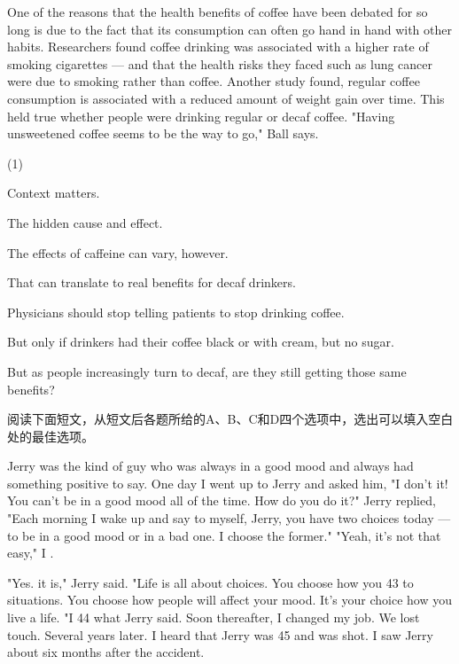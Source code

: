 \documentclass{英语试卷}
\begin{document}
\par One of the reasons that the health benefits of coffee have been debated for so long is due to the fact that its consumption can often go hand in hand with other habits. Researchers found coffee drinking was associated with a higher rate of smoking cigarettes — and that the health risks they faced such as lung cancer were due to smoking rather than coffee. Another study found, regular coffee consumption is associated with a reduced amount of weight gain over time.  This held true whether people were drinking regular or decaf coffee. "Having unsweetened coffee seems to be the way to go," Ball says.\par
\begin{choices}(1)
  \item Context matters.
  \item The hidden cause and effect.
  \item The effects of caffeine can vary, however.
  \item That can translate to real benefits for decaf drinkers.
  \item Physicians should stop telling patients to stop drinking coffee.
  \item But only if drinkers had their coffee black or with cream, but no sugar.
  \item But as people increasingly turn to decaf, are they still getting those same benefits?
\end{choices}
\par 阅读下面短文，从短文后各题所给的A、B、C和D四个选项中，选出可以填入空白处的最佳选项。\par
\par Jerry was the kind of guy who was always in a good mood and always had something positive to say. One day I went up to Jerry and asked him, "I don't  it! You can't be in a good mood all of the time. How do you do it?" Jerry replied, "Each morning I wake up and say to myself, Jerry, you have two choices today — to be in a good mood or in a bad one. I choose the former." "Yeah, it's not that easy," I .\par
\par "Yes. it is," Jerry said. "Life is all about choices. You choose how you \blanknum{} 43\blanknum{} to situations. You choose how people will affect your mood. It's your choice how you live a life. "I \blanknum{} 44\blanknum{} what Jerry said. Soon thereafter, I changed my job. We lost touch. Several years later. I heard that Jerry was \blanknum{} 45\blanknum{} and was shot. I saw Jerry about six months after the accident.\par
\end{document}
